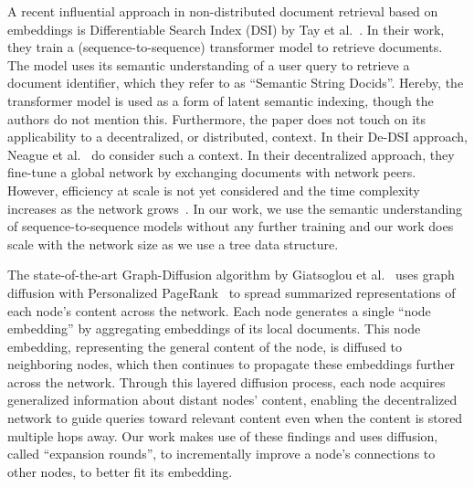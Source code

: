 \documentclass[10pt,journal]{IEEEtran}
\begin{document}
A recent influential approach in non-distributed document retrieval based on embeddings is Differentiable Search Index (DSI) by Tay et al.~\cite{tay2022transformer}.
In their work, they train a (sequence-to-sequence) transformer model to retrieve documents.
The model uses its semantic understanding of a user query to retrieve a document identifier, which they refer to as ``Semantic String Docids''.
Hereby, the transformer model is used as a form of latent semantic indexing, though the authors do not mention this.
Furthermore, the paper does not touch on its applicability to a decentralized, or distributed, context.
In their De-DSI approach, Neague et al.~\cite{neague2024dsi} do consider such a context.
In their decentralized approach, they fine-tune a global network by exchanging documents with network peers.
However, efficiency at scale is not yet considered and the time complexity increases as the network grows~\cite{neague2024dsi}.
In our work, we use the semantic understanding of sequence-to-sequence models without any further training and our work does scale with the network size as we use a tree data structure.



The state-of-the-art Graph-Diffusion algorithm by Giatsoglou et al.~\cite{giatsoglou2022graph} uses graph diffusion with Personalized PageRank~\cite{gasteiger2018predict} to spread summarized representations of each node’s content across the network. Each node generates a single ``node embedding'' by aggregating embeddings of its local documents. This node embedding, representing the general content of the node, is diffused to neighboring nodes, which then continues to propagate these embeddings further across the network. Through this layered diffusion process, each node acquires generalized information about distant nodes’ content, enabling the decentralized network to guide queries toward relevant content even when the content is stored multiple hops away.
Our work makes use of these findings and uses diffusion, called ``expansion rounds'', to incrementally improve a node's connections to other nodes, to better fit its embedding.
\end{document}

